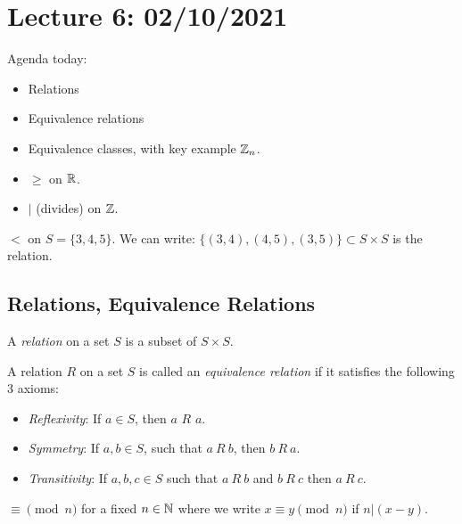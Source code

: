 \section{Lecture 6: 02/10/2021}

Agenda today:
\begin{itemize}
    \item Relations
    \item Equivalence relations
    \item Equivalence classes, with key example $\mathbb{Z}_n$.
\end{itemize}

\begin{example}\quad
\begin{itemize}
    \item $\ge$ on $\mathbb{R}$.
    \item $|$ (divides) on $\mathbb{Z}$.
\end{itemize}
\end{example}

\begin{example}
$<$ on $S = \{3, 4, 5\}$. We can write:
$\{(3, 4), (4, 5), (3,5)\} \subset S \times S$ is the relation.
\end{example}

\subsection{Relations, Equivalence Relations}

\begin{definition}[Relation]
A \textit{relation} on a set $S$ is a subset of $S \times S$.
\end{definition}

\begin{definition}
A relation $R$ on a set $S$ is called an \textit{equivalence relation} if it satisfies the following $3$ axioms:
\begin{itemize}
    \item \textit{Reflexivity}: If $a \in S$, then $a$ $R$ $a$.
    \item \textit{Symmetry}: If $a, b \in S$, such that $a \ R \ b$, then $b \ R \ a$.
    \item \textit{Transitivity}: If $a,b,c \in S$ such that $a \ R \ b$ and $b \ R \ c$ then $a \ R \ c$.
\end{itemize}
\end{definition}

\begin{example}
$\equiv \pmod n$ for a fixed $n \in \mathbb{N}$ where we write $x \equiv y \pmod n$ if $n | (x-y)$.
\end{example}

